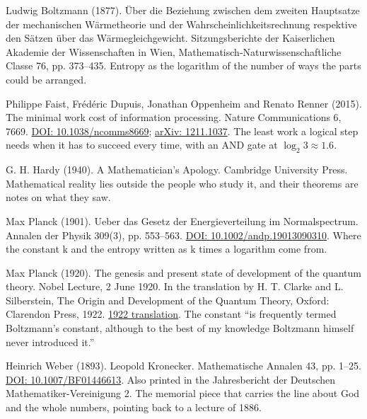 \documentclass[11pt,twoside]{article}
\theoremstyle{thielethm}
\theoremstyle{thieledef}
\theoremstyle{thieledef}
\theoremstyle{thieledef}
\theoremstyle{thielethm}
\theoremstyle{thieleobs}
\theoremstyle{thielethm}
\begin{document}
\noindent Ludwig Boltzmann (1877). \"Uber die Beziehung zwischen dem zweiten Hauptsatze der mechanischen W\"armetheorie und der Wahrscheinlichkeitsrechnung respektive den S\"atzen \"uber das W\"armegleichgewicht. Sitzungsberichte der Kaiserlichen Akademie der Wissenschaften in Wien, Mathematisch-Naturwissenschaftliche Classe 76, pp. 373--435. Entropy as the logarithm of the number of ways the parts could be arranged.
\par\medskip

\noindent Philippe Faist, Fr\'ed\'eric Dupuis, Jonathan Oppenheim and Renato Renner (2015). The minimal work cost of information processing. Nature Communications 6, 7669. \href{https://doi.org/10.1038/ncomms8669}{DOI: 10.1038/ncomms8669}; \href{https://arxiv.org/abs/1211.1037}{arXiv: 1211.1037}. The least work a logical step needs when it has to succeed every time, with an AND gate at $\log_2 3 \approx 1.6$.
\par\medskip

\noindent G. H. Hardy (1940). A Mathematician's Apology. Cambridge University Press. Mathematical reality lies outside the people who study it, and their theorems are notes on what they saw.
\par\medskip

\noindent Max Planck (1901). Ueber das Gesetz der Energieverteilung im Normalspectrum. Annalen der Physik 309(3), pp. 553--563. \href{https://doi.org/10.1002/andp.19013090310}{DOI: 10.1002/andp.19013090310}. Where the constant k and the entropy written as k times a logarithm come from.
\par\medskip

\noindent Max Planck (1920). The genesis and present state of development of the quantum theory. Nobel Lecture, 2 June 1920. In the translation by H. T. Clarke and L. Silberstein, The Origin and Development of the Quantum Theory, Oxford: Clarendon Press, 1922. \href{https://www.gutenberg.org/cache/epub/33663/pg33663-images.html}{1922 translation}. The constant ``is frequently termed Boltzmann's constant, although to the best of my knowledge Boltzmann himself never introduced it.''
\par\medskip

\noindent Heinrich Weber (1893). Leopold Kronecker. Mathematische Annalen 43, pp. 1--25. \href{https://doi.org/10.1007/BF01446613}{DOI: 10.1007/BF01446613}. Also printed in the Jahresbericht der Deutschen Mathematiker-Vereinigung 2. The memorial piece that carries the line about God and the whole numbers, pointing back to a lecture of 1886.
\par\medskip
\end{document}
